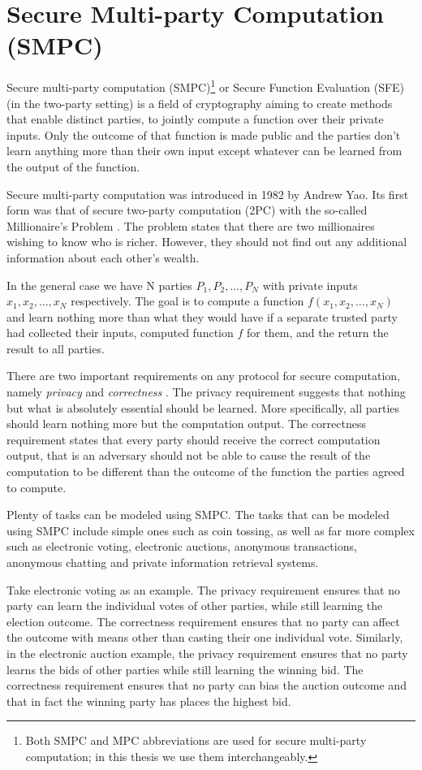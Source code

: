 \section{Secure Multi-party Computation (SMPC)}\label{s:smpc}
Secure multi-party computation (SMPC)\footnote{Both SMPC and MPC abbreviations are used for secure multi-party computation; in this thesis we use them interchangeably.} or Secure Function Evaluation (SFE) (in the two-party setting) is a field of cryptography aiming to create methods that enable distinct parties, to jointly compute a function over their private inputs.
Only the outcome of that function is made public and the parties don’t learn anything more than their own input except whatever can be learned from the output of the function.

Secure multi-party computation was introduced in 1982 by Andrew Yao.
Its first form was that of secure two-party computation (2PC) with the so-called Millionaire's Problem \cite{yao1982protocols}.
The problem states that there are two millionaires wishing to know who is richer.
However, they should not find out any additional information about each other’s wealth.

In the general case we have N parties $P_1, P_2, \dots, P_N$ with private inputs $x_1, x_2, \dots, x_N$ respectively.
The goal is to compute a function $f(x_1, x_2, \dots, x_N)$ and learn nothing more than what they would have if a separate trusted party had collected their inputs, computed function $f$ for them, and the return the result to all parties.

There are two important requirements on any protocol for secure computation, namely \textit{privacy} and \textit{correctness} \cite{lindell2009secure}.
The privacy requirement suggests that nothing but what is absolutely essential should be learned.
More specifically, all parties should learn nothing more but the computation output.
The correctness requirement states that every party should receive the correct computation output, that is an adversary should not be able to cause the result of the computation to be different than the outcome of the function the parties agreed to compute.

Plenty of tasks can be modeled using SMPC.
The tasks that can be modeled using SMPC include simple ones such as coin tossing, as well as far more complex such as electronic voting, electronic auctions, anonymous transactions, anonymous chatting and private information retrieval systems.

Take electronic voting as an example.
The privacy requirement ensures that no party can learn the individual votes of other parties, while still learning the election outcome.
The correctness requirement ensures that no party can affect the outcome with means other than casting their one individual vote.
Similarly, in the electronic auction example, the privacy requirement ensures that no party learns the bids of other parties while still learning the winning bid. The correctness requirement ensures that no party can bias the auction outcome and that in fact the winning party has places the highest bid.

